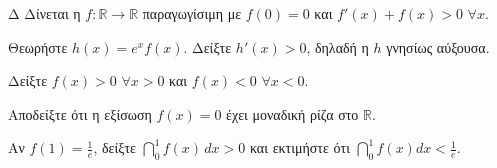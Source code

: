 \begin{thema}{Δ}
Δίνεται η $f:\mathbb{R}\to\mathbb{R}$ παραγωγίσιμη με $f(0)=0$ και $f'(x) + f(x) > 0$ $\forall x$.
\begin{erwthma}
    \item Θεωρήστε $h(x)=e^x f(x)$. Δείξτε $h'(x) > 0$, δηλαδή η $h$ γνησίως αύξουσα. 
    \item Δείξτε $f(x)>0$ $\forall x>0$ και $f(x)<0$ $\forall x<0$. 
    \item Αποδείξτε ότι η εξίσωση $f(x)=0$ έχει μοναδική ρίζα στο $\mathbb{R}$. 
    \item Αν $f(1)=\frac{1}{e}$, δείξτε $\dint_0^1 f(x)\,dx > 0$ και εκτιμήστε ότι $\dint_0^1 f(x)dx < \frac{1}{e}$. 
\end{erwthma}
\end{thema}

